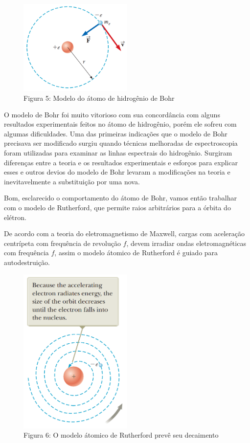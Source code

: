 \documentclass[12pt, letterpaper]{article}
\begin{document}
    \begin{figure}[h]
        \centering
        \includegraphics[width=0.5\textwidth]{bohr}
        \\{Figura 5: Modelo do átomo de hidrogênio de Bohr}
        \label{fig:bohr}
    \end{figure}

    O modelo de Bohr foi muito vitorioso com sua concordância com alguns resultados experimentais feitos no átomo de hidrogênio, porém ele sofreu com algumas dificuldades. Uma das primeiras indicações que o modelo de Bohr precisava ser modificado surgiu quando técnicas melhoradas de espectroscopia foram utilizadas para examinar as linhas espectrais do hidrogênio. Surgiram diferenças entre a teoria e os resultados experimentais e esforços para explicar esses e outros devios do modelo de Bohr levaram a modificações na teoria e inevitavelmente a substituição por uma nova.

    \newpage
    Bom, esclarecido o comportamento do átomo de Bohr, vamos então trabalhar com o modelo de Rutherford, que permite raios arbitrários para a órbita do elétron.

    De acordo com a teoria do eletromagnetismo de Maxwell, cargas com aceleração centrípeta com frequência de revolução $f$, devem irradiar ondas eletromagnéticas com frequência $f$, assim o modelo átomico de Rutherford é guiado para autodestruição. 

    \begin{figure}[H]
        \centering
        \includegraphics[width=0.5\textwidth]{ruth}
        \\{Figura 6: O modelo átomico de Rutherford prevê seu decaimento}
        \label{fig:ruth}
    \end{figure}
\end{document}

